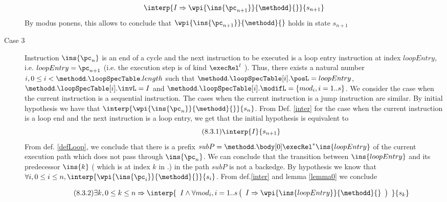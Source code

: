 \begin{description}
\begin{equation*}
\begin{array}{l}
                  \interp{ I \Rightarrow \wpi{\ins{\pc_{n+1}}}{\methodd}{} }
                                     {s_{n+1}  } \\
    \end{array} 
\end{equation*}
By modus ponens, this allows to conclude that $\wpi{\ins{\pc_{n+1}}}{\methodd}{} $ holds in state 
$s_{n+1} $

\item [Case 3]
Instruction $\ins{\pc_n} $ is an end of a cycle  and the next instruction to be executed is a loop entry 
instruction at index $loopEntry $, i.e.  $loopEntry = \pc_{n +1}$ %
 (i.e. the execution step is of kind $\execRel^l$ ).
 Thus, there exists a natural number  $ i , 0 \le i < \methodd.\loopSpecTable.length   $   such that
 $ \methodd. \loopSpecTable[i].\posL = loopEntry $,  $ \methodd. \loopSpecTable[i].\invL = I $ and
   $ \methodd. \loopSpecTable[i].\modifL =\{ mod_i, i = 1..s \}$.
We consider the case when the current instruction is a sequential instruction. The cases when the current instruction 
is a jump instruction are similar. By initial hypothesis we have that 
 $\interp{ \wpi{\ins{\pc_n} }{\methodd}{}}{s_n}$. 
From Def. \ref{inter}  for the case when the current instruction is a loop end and the next instruction is a loop entry, we get that the initial hypothesis
is equivalent to   
\begin{equation*} \label{eq12} \tag{8.3.1} 
 \interp{ I}{s_{n + 1}}  
\end{equation*} 
   From def. \ref{defLoop}, we  conclude that there is a prefix  $subP = \methodd.\body[0] \execRel^{*} \ins{loopEntry}$  of the current
 execution path which does not pass through $\ins{\pc_n}$. We can conclude that the transition between   $\ins{loopEntry}$ and its predecessor 
 $ \ins{k} $ ( which is at index $k$ in \methodd.\body)
	  in the path $subP$ is not a backedge. By hypothesis we know that 
           $ \forall i , 0 \le i \le  n, \interp{\wpi{\ins{\pc_i}}{\methodd}{}}{s_i}$.  From def.\ref{inter} and
	 lemma \ref{lemma0} we conclude 
          
   \begin{equation*} \label{eq13} \tag{8.3.2} 
         \exists k, 0 \le k \le n \Rightarrow 
         \interp{ \begin{array}{l}
	                                    I 
					    \wedge
                                           \forall mod_i ,  i = 1..s \left( \begin{array}{l } 
	                                                           I \Rightarrow 
	                                                           \wpi{\ins{loopEntry}}{\methodd}{} 
							      \end{array}\right)
				 \end{array} }{s_k} 
 \end{equation*} 


\end{description}
